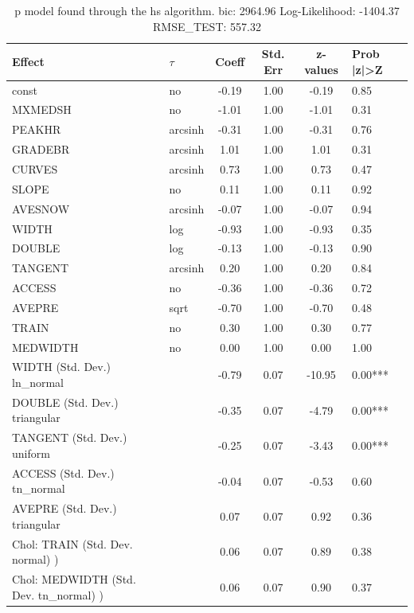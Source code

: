 \begin{table}
	\caption{p model found through the hs algorithm. bic: 2964.96 Log-Likelihood: -1404.37 RMSE_TEST: 557.32}
	\begin{center}
		\begin{tabular}{|l|l|c|c|c|l|}
			\hline
			Effect & $\tau$ & Coeff & Std. Err & z-values & Prob |z|>Z \\
			\hline
			const & no & -0.19 & 1.00 & -0.19 & 0.85 \\
			\hline
			MXMEDSH & no & -1.01 & 1.00 & -1.01 & 0.31 \\
			\hline
			PEAKHR & arcsinh & -0.31 & 1.00 & -0.31 & 0.76 \\
			\hline
			GRADEBR & arcsinh & 1.01 & 1.00 & 1.01 & 0.31 \\
			\hline
			CURVES & arcsinh & 0.73 & 1.00 & 0.73 & 0.47 \\
			\hline
			SLOPE & no & 0.11 & 1.00 & 0.11 & 0.92 \\
			\hline
			AVESNOW & arcsinh & -0.07 & 1.00 & -0.07 & 0.94 \\
			\hline
			WIDTH & log & -0.93 & 1.00 & -0.93 & 0.35 \\
			\hline
			DOUBLE & log & -0.13 & 1.00 & -0.13 & 0.90 \\
			\hline
			TANGENT & arcsinh & 0.20 & 1.00 & 0.20 & 0.84 \\
			\hline
			ACCESS & no & -0.36 & 1.00 & -0.36 & 0.72 \\
			\hline
			AVEPRE & sqrt & -0.70 & 1.00 & -0.70 & 0.48 \\
			\hline
			TRAIN & no & 0.30 & 1.00 & 0.30 & 0.77 \\
			\hline
			MEDWIDTH & no & 0.00 & 1.00 & 0.00 & 1.00 \\
			\hline
			WIDTH (Std. Dev.) ln_normal &  & -0.79 & 0.07 & -10.95 & 0.00*** \\
			\hline
			DOUBLE (Std. Dev.) triangular &  & -0.35 & 0.07 & -4.79 & 0.00*** \\
			\hline
			TANGENT (Std. Dev.) uniform &  & -0.25 & 0.07 & -3.43 & 0.00*** \\
			\hline
			ACCESS (Std. Dev.) tn_normal &  & -0.04 & 0.07 & -0.53 & 0.60 \\
			\hline
			AVEPRE (Std. Dev.) triangular &  & 0.07 & 0.07 & 0.92 & 0.36 \\
			\hline
			 Chol: TRAIN (Std. Dev. normal) ) &  & 0.06 & 0.07 & 0.89 & 0.38 \\
			\hline
			 Chol: MEDWIDTH (Std. Dev. tn_normal) ) &  & 0.06 & 0.07 & 0.90 & 0.37 \\

\end{tabular}
\end{center}
\end{table}
